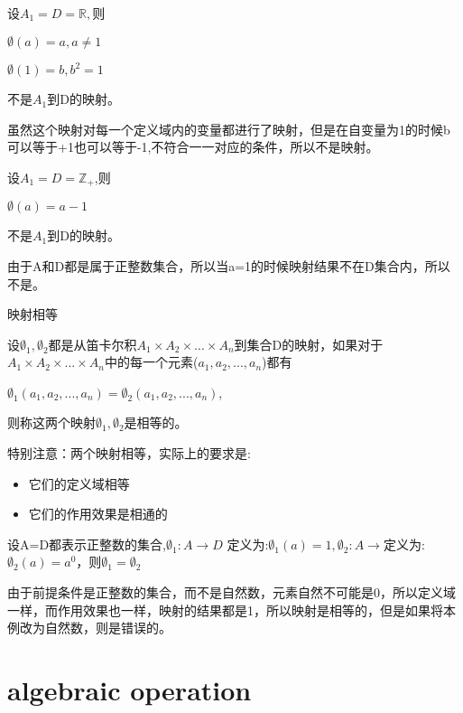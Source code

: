\documentclass[
	11pt, %
	fleqn, %
	a4paper, %
]{LegrandOrangeBook}
\begin{document}
\begin{example}
	设$A_1=D=\mathbb{R},则$

	$\emptyset(a)=a,a\not =1$\par
	$\emptyset(1)=b,b^2=1$\par
	不是$A_1$到D的映射。\par
	虽然这个映射对每一个定义域内的变量都进行了映射，但是在自变量为1的时候b可以等于+1也可以等于-1,不符合一一对应的条件，所以不是映射。
\end{example}

\begin{example}
	设$A_1=D=\mathbb{Z}_+$,则\par
	$\emptyset(a)=a-1$\par
	不是$A_1$到D的映射。\par
	由于A和D都是属于正整数集合，所以当a=1的时候映射结果不在D集合内，所以不是。
\end{example}

\begin{theorem}{映射相等}

	设$\emptyset_1,\emptyset_2$都是从笛卡尔积$A_1\times A_2 \times ...\times A_n$到集合D的映射，如果对于$A_1\times A_2 \times ...\times A_n$中的每一个元素($a_1,a_2,...,a_n$)都有
	\begin{center}
		$\emptyset_1(a_1,a_2,...,a_n)=\emptyset_2(a_1,a_2,...,a_n)$,
	\end{center}\par
	则称这两个映射$\emptyset_1,\emptyset_2$是相等的。
\end{theorem}
\begin{remark}
	特别注意：两个映射相等，实际上的要求是:
	\begin{itemize}
		\item 它们的定义域相等
		\item 它们的作用效果是相通的
	\end{itemize}
\end{remark}

\begin{example}
	设A=D都表示正整数的集合,$\emptyset_1: A\rightarrow D$ 定义为:$\emptyset_1(a)=1,\emptyset_2: A\rightarrow $定义为:$\emptyset_2(a)=a^0$，则$\emptyset_1=\emptyset_2$

	由于前提条件是正整数的集合，而不是自然数，元素自然不可能是0，所以定义域一样，而作用效果也一样，映射的结果都是1，所以映射是相等的，但是如果将本例改为自然数，则是错误的。
\end{example}
\section{algebraic operation}
\end{document}
